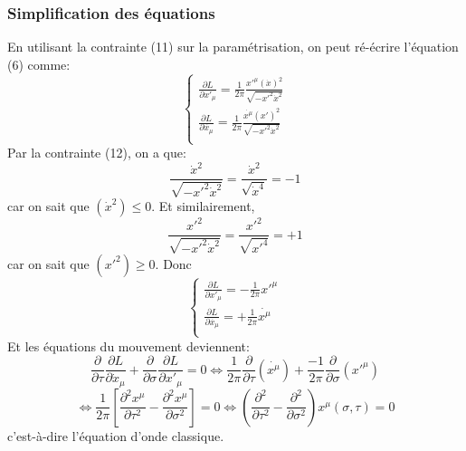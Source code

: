 \documentclass[a4paper,12pt]{article}
\def\xmu{x^\mu}
\begin{document}
\subsubsection{Simplification des équations}
En utilisant la contrainte (11) sur la paramétrisation, on peut ré-écrire l'équation (6) comme:
\begin{equation}
	\left\lbrace
	\begin{aligned}
	\frac{\partial L}{\partial x'_\mu }=\frac{1}{2\pi}\frac{x'^\mu (\dot{x})^2}{\sqrt{-x'^2\dot{x}^2}}\\
	\frac{\partial L}{\partial \dot{x_\mu}}=\frac{1}{2\pi}\frac{\dot{\xmu} (x')^2}{\sqrt{-x'^2\dot{x}^2}}\\
	\end{aligned}
	\right.
\end{equation}
Par la contrainte (12), on a que:
$$\frac{\dot{x}^2}{\sqrt{-x'^2\dot{x}^2}}=\frac{\dot{x}^2}{\sqrt{\dot{x}^4}}=-1$$ car on sait que $(\dot{x}^2)\leq0$.
Et similairement,
$$\frac{x'^2}{\sqrt{-x'^2\dot{x}^2}}=\frac{x'^2}{\sqrt{x'^4}}=+1$$
car on sait que $(x'^2)\geq0$.
Donc
\begin{equation}
	\left\lbrace
	\begin{aligned}
	\frac{\partial L}{\partial x'_\mu }=-\frac{1}{2\pi}x'^\mu\\
	\frac{\partial L}{\partial \dot{x_\mu}}=+\frac{1}{2\pi}\dot{\xmu}\\
	\end{aligned}
	\right.
\end{equation}
Et les équations du mouvement deviennent:
$$\frac{\partial}{\partial \tau}\frac{\partial L}{\partial \dot x_{\mu}}+\frac{\partial}{\partial \sigma}\frac{\partial L}{\partial  x'_{\mu}}=0 \Leftrightarrow \frac{1}{2\pi}\frac{\partial}{\partial \tau}\left( \dot{\xmu}\right)+\frac{-1}{2\pi}\frac{\partial}{\partial \sigma}\left( x'^\mu\right) $$
$$\Leftrightarrow \frac{1}{2\pi}\left[ \frac{\partial^2 x^\mu}{\partial \tau^2}-\frac{\partial^2 x^\mu}{\partial \sigma^2}\right] =0 \Leftrightarrow \left( \frac{\partial^2}{\partial \tau^2}-\frac{\partial^2 }{\partial \sigma^2}\right) \xmu(\sigma,\tau)=0$$
c'est-à-dire l'équation d'onde classique.
\end{document}
